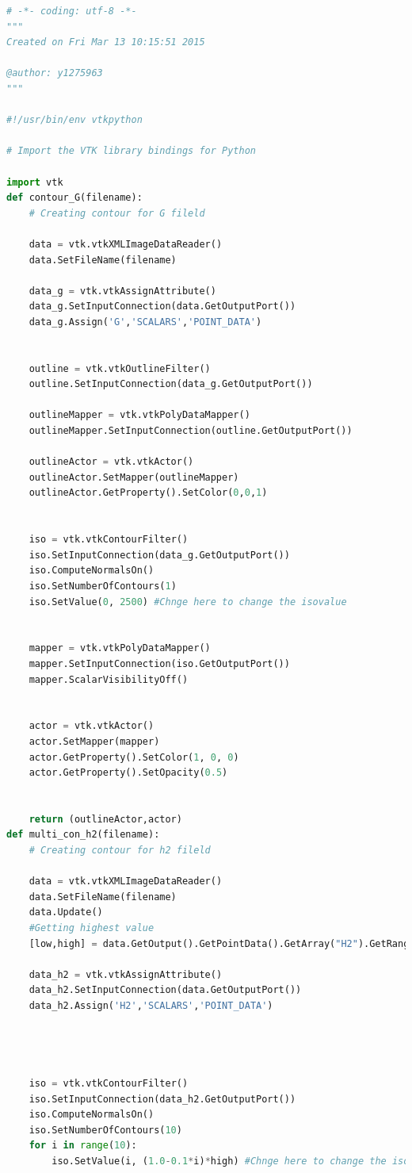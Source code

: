 \documentclass[11pt]{scrartcl}
\begin{document}
\begin{lstlisting}[language=Python]
# -*- coding: utf-8 -*-
"""
Created on Fri Mar 13 10:15:51 2015

@author: y1275963
"""

#!/usr/bin/env vtkpython

# Import the VTK library bindings for Python

import vtk
def contour_G(filename):
    # Creating contour for G fileld
    
    data = vtk.vtkXMLImageDataReader()
    data.SetFileName(filename)     

    data_g = vtk.vtkAssignAttribute()
    data_g.SetInputConnection(data.GetOutputPort())
    data_g.Assign('G','SCALARS','POINT_DATA')
    

    outline = vtk.vtkOutlineFilter()
    outline.SetInputConnection(data_g.GetOutputPort())
    
    outlineMapper = vtk.vtkPolyDataMapper()
    outlineMapper.SetInputConnection(outline.GetOutputPort())
    
    outlineActor = vtk.vtkActor()
    outlineActor.SetMapper(outlineMapper)
    outlineActor.GetProperty().SetColor(0,0,1)
    
    
    iso = vtk.vtkContourFilter()
    iso.SetInputConnection(data_g.GetOutputPort())
    iso.ComputeNormalsOn()
    iso.SetNumberOfContours(1)
    iso.SetValue(0, 2500) #Chnge here to change the isovalue
    
    
    mapper = vtk.vtkPolyDataMapper()
    mapper.SetInputConnection(iso.GetOutputPort())
    mapper.ScalarVisibilityOff()
    
  
    actor = vtk.vtkActor()
    actor.SetMapper(mapper)
    actor.GetProperty().SetColor(1, 0, 0)
    actor.GetProperty().SetOpacity(0.5)
    
 
    return (outlineActor,actor)
def multi_con_h2(filename):
    # Creating contour for h2 fileld
    
    data = vtk.vtkXMLImageDataReader()
    data.SetFileName(filename) 
    data.Update()
    #Getting highest value
    [low,high] = data.GetOutput().GetPointData().GetArray("H2").GetRange()

    data_h2 = vtk.vtkAssignAttribute()
    data_h2.SetInputConnection(data.GetOutputPort())
    data_h2.Assign('H2','SCALARS','POINT_DATA')
    
    
    
 
    iso = vtk.vtkContourFilter()
    iso.SetInputConnection(data_h2.GetOutputPort())
    iso.ComputeNormalsOn()
    iso.SetNumberOfContours(10)
    for i in range(10):
        iso.SetValue(i, (1.0-0.1*i)*high) #Chnge here to change the isovalue
    

\end{lstlisting}
\end{document}
